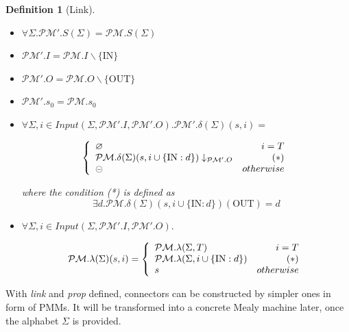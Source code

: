 \documentclass[conference, a4paper]{IEEEtran}
\newtheorem{definition}{Definition}
\newcommand{\rblock}[0]{\circleddash}
\newcommand{\rempty}[0]{\varnothing}
\newcommand{\OUT}[0]{\mbox{OUT}}
\newcommand{\IN}[0]{\mbox{IN}}
\begin{document}
\begin{definition}[Link]
  \begin{itemize}
  	\item[-] $\forall\Sigma. \mathcal{PM}'.S(\Sigma)=\mathcal{PM}.S(\Sigma)$
    \item[-] $\mathcal{PM}'.I=\mathcal{PM}.I\backslash\{\IN\}$
    \item[-] $\mathcal{PM}'.O=\mathcal{PM}.O\backslash\{\OUT\}$
    \item[-] $\mathcal{PM}'.s_0=\mathcal{PM}.s_0$
    \item[-] $\forall\Sigma, i\in
      Input(\Sigma,\mathcal{PM}'.I,\mathcal{PM}'.O).\mathcal{PM}'.\delta(\Sigma)(s,i)=$
      \begin{small}
        \begin{displaymath}
          \left\{
          \begin{array}[h]{lr}
            \rempty & i=T \\
            \mathcal{PM}.\delta(\Sigma)(s,i\cup\{\IN:d\})\downarrow_{\mathcal{PM}'.O} & (*)\\
            \rblock & otherwise \\
          \end{array}
          \right.
        \end{displaymath}
      \end{small}
      where the condition (*) is defined as
      \[
      \exists d.\mathcal{PM}.\delta(\Sigma)(s,i\cup\{\IN:d\})(\OUT)=d
      \]
    \item[-] $\forall\Sigma, i\in
      Input(\Sigma,\mathcal{PM}'.I,\mathcal{PM}'.O).$
      \begin{small}
        \begin{displaymath}
          \mathcal{PM}.\lambda(\Sigma)(s,i)=
          \left\{
          \begin{array}[ht]{lr}
            \mathcal{PM}.\lambda(\Sigma,T) & i=T \\
            \mathcal{PM}.\lambda(\Sigma,i\cup\{\IN:d\}) & (*)\\
            s & otherwise \\
          \end{array}
          \right.
        \end{displaymath}
      \end{small}
  \end{itemize}
\end{definition}

With \emph{link} and \emph{prop} defined, connectors can be constructed by simpler ones in
form of PMMs. It will be transformed into a concrete Mealy machine later, once the alphabet $\Sigma$
is provided.
\end{document}
